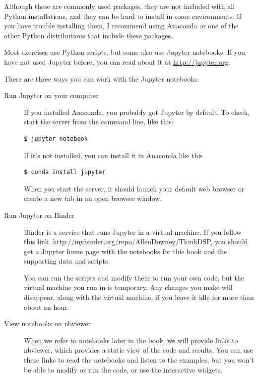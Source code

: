 \documentclass[12pt]{book}
\begin{document}
Although these are commonly used packages, they are not included with
all Python installations, and they can be hard to install in some
environments.  If you have trouble installing them, I
recommend using Anaconda or one of the other Python distributions
that include these packages.

Most exercises use Python scripts, but some also use Jupyter
notebooks.  If you have not used Jupyter before, you can read about
it at \url{http://jupyter.org}.

There are three ways you can work with the Jupyter notebooks:

\begin{description}

\item[Run Jupyter on your computer]

If you installed Anaconda, you
  probably got Jupyter by default.  To check, start the server from
the command line, like this:

\begin{verbatim}
$ jupyter notebook
\end{verbatim}

If it's not installed, you can install it in Anaconda like this

\begin{verbatim}
$ conda install jupyter
\end{verbatim}

When you start the server, it should launch your default web browser
or create a new tab in an open browser window.

\item[Run Jupyter on Binder]

Binder is a service that runs Jupyter in a virtual machine.  If you
follow this link, \url{http://mybinder.org/repo/AllenDowney/ThinkDSP},
you should get a Jupyter home page with the notebooks for this book
and the supporting data and scripts.

You can run the scripts and modify them to run your own code, but the
virtual machine you run in is temporary.  Any changes you make will
disappear, along with the virtual machine, if you leave it idle for
more than about an hour.

\item[View notebooks on nbviewer]

When we refer to notebooks later in the book, we will provide links to
nbviewer, which provides a static view of the code and results.  You
can use these links to read the notebooks and listen to the examples,
but you won't be able to modify or run the code, or use the
interactive widgets.

\end{description}
\end{document}
